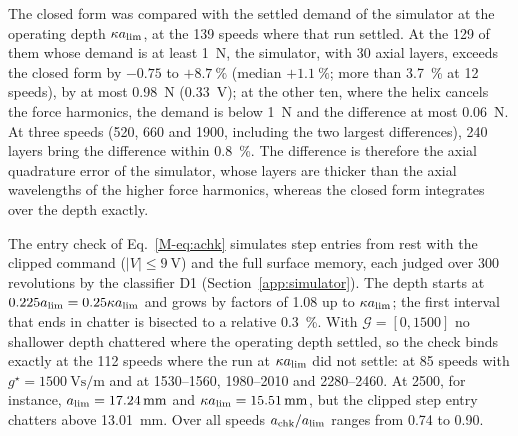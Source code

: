 The closed form was compared with the settled demand of the simulator at the operating depth $\kappa a_{\lim}$, at the 139 speeds where that run settled. At the 129 of them whose demand is at least \SI{1}{\newton}, the simulator, with 30 axial layers, exceeds the closed form by $-0.75$ to $+\SI{8.7}{\percent}$ (median $+\SI{1.1}{\percent}$; more than \SI{3.7}{\percent} at 12 speeds), by at most \SI{0.98}{\newton} (\SI{0.33}{\volt}); at the other ten, where the helix cancels the force harmonics, the demand is below \SI{1}{\newton} and the difference at most \SI{0.06}{\newton}. At three speeds (520, 660 and \SI{1900}{\rpm}, including the two largest differences), 240 layers bring the difference within \SI{0.8}{\percent}. The difference is therefore the axial quadrature error of the simulator, whose layers are thicker than the axial wavelengths of the higher force harmonics, whereas the closed form integrates over the depth exactly.

The entry check of Eq.~\eqref{M-eq:achk} simulates step entries from rest with the clipped command ($\lvert V\rvert\le\SI{9}{\volt}$) and the full surface memory, each judged over 300 revolutions by the classifier D1 (Section~\ref{app:simulator}). The depth starts at $0.225a_{\lim}=0.25\kappa a_{\lim}$ and grows by factors of 1.08 up to $\kappa a_{\lim}$; the first interval that ends in chatter is bisected to a relative \SI{0.3}{\percent}. With $\mathcal G=[0,1500]$ no shallower depth chattered where the operating depth settled, so the check binds exactly at the 112 speeds where the run at $\kappa a_{\lim}$ did not settle: at 85 speeds with $g^\star=\SI{1500}{\volt\second\per\metre}$ and at 1530--1560, 1980--2010 and 2280--\SI{2460}{\rpm}. At \SI{2500}{\rpm}, for instance, $a_{\lim}=\SI{17.24}{\milli\metre}$ and $\kappa a_{\lim}=\SI{15.51}{\milli\metre}$, but the clipped step entry chatters above \SI{13.01}{\milli\metre}. Over all speeds $a_{\mathrm{chk}}/a_{\lim}$ ranges from 0.74 to 0.90.

